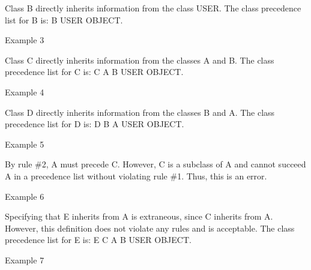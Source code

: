 \documentclass[letterpaper,10pt,english]{sphinxmanual}
\begin{document}
Class B directly inherits information from the class USER. The class
precedence list for B is: B USER OBJECT.

Example 3

\begin{sphinxVerbatim}[commandchars=\\\{\}]
    
\end{sphinxVerbatim}

Class C directly inherits information from the classes A and B. The
class precedence list for C is: C A B USER OBJECT.

Example 4

\begin{sphinxVerbatim}[commandchars=\\\{\}]
    
\end{sphinxVerbatim}

Class D directly inherits information from the classes B and A. The
class precedence list for D is: D B A USER OBJECT.

Example 5

\begin{sphinxVerbatim}[commandchars=\\\{\}]
    
\end{sphinxVerbatim}

By rule \#2, A must precede C. However, C is a subclass of A and cannot
succeed A in a precedence list without violating rule \#1. Thus, this is
an error.

Example 6

\begin{sphinxVerbatim}[commandchars=\\\{\}]
    
\end{sphinxVerbatim}

Specifying that E inherits from A is extraneous, since C inherits from
A. However, this definition does not violate any rules and is
acceptable. The class precedence list for E is: E C A B USER OBJECT.

Example 7
\end{document}
